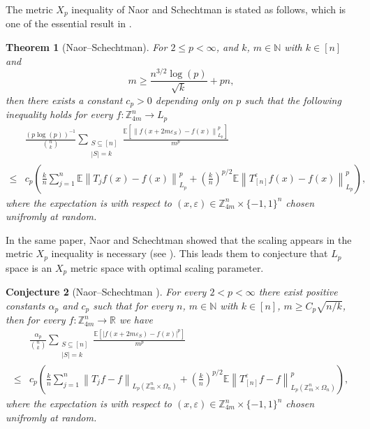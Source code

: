 \documentclass{amsart}
\numberwithin{equation}{section}
\newtheorem{thm}{Theorem}[section]
\newtheorem{conj}[thm]{Conjecture}
\newcommand{\Z}{{\mathbb{Z}^{n}_{m}}}
\begin{document}
The metric $X_{p}$ inequality of Naor and Schechtman is stated as follows, which is one of the essential result in \cite{N-S2016}.
\begin{thm}[Naor--Schechtman]
For $2\leq p<\infty$, and $k$, $m\in \mathbb{N}$ with $k\in [n]$ and
\[
m\geq \frac{n^{3/2}\log(p)}{\sqrt{k}}+pn,
\]
then there exists a constant $c_{p}>0$ depending only on $p$ such that the following inequality holds for every $f:\mathbb{Z}^{n}_{4m}\to L_{p}$
\[
\begin{split}
&\frac{(p\log(p))^{-1}}{\binom{n}{k}}\sum_{\substack{S\subseteq[n] \\|S|=k}}\frac{\mathbb{E}\left[\left\|f(x+2m\varepsilon_{S})-f(x)\right\|^{p}_{L_{p}}\right]}{m^{p}}\\
\leq& c_{p}\left(\frac{k}{n}\sum_{j=1}^{n}\mathbb{E}\left\|T_{j}f(x)-f(x)\right\|^{p}_{L_{p}}+\left(\frac{k}{n}\right)^{p/2}\mathbb{E}\left\|T^{\varepsilon}_{[n]}f(x)-f(x)\right\|^{p}_{L_{p}}\right),
\end{split}
\]
where the expectation is with respect to $(x,\varepsilon)\in \mathbb{Z}^{n}_{4m}\times \{-1,1\}^{n}$ chosen unifromly at random.
\end{thm}
\noindent In the same paper, Naor and Schechtman showed that the scaling appears in the metric $X_{p}$ inequality is necessary (see \cite[Propostion 1.4]{N-S2016}). This leads them to conjecture that $L_{p}$ space is an $X_{p}$ metric space with optimal scaling parameter.
\begin{conj}[Naor--Schechtman \cite{N-S2016}]\label{N-S conjecture}
For every $2<p<\infty$ there exist positive constants $\alpha_{p}$ and $c_{p}$ such that for every $n$, $m\in \mathbb{N}$ with $k\in[n]$, $m\geq C_{p}\sqrt{n/k}$, then for every $f:\mathbb{Z}^{n}_{4m}\to \mathbb{R}$ we have
\[
\begin{split}
&\frac{\alpha_{p}}{\binom{n}{k}}\sum_{\substack{S\subseteq [n] \\|S|=k}}\frac{\mathbb{E}\left[\left|f(x+2m\varepsilon_{S})-f(x)\right|^{p}\right]}{m^{p}}\\
\leq& c_{p}\left(\frac{k}{n}\sum_{j=1}^{n}\left\|T_{j}f-f\right\|_{L_{p}(\Z\times \Omega_{n})}+\left(\frac{k}{n}\right)^{p/2}\mathbb{E}\left\|T^{\varepsilon}_{[n]}f-f\right\|^{p}_{L_{p}(\Z\times \Omega_{n})}\right),
\end{split}
\]
where the expectation is with respect to $(x,\varepsilon)\in \mathbb{Z}^{n}_{4m}\times \{-1,1\}^{n}$ chosen unifromly at random.
\end{conj}
\end{document}
